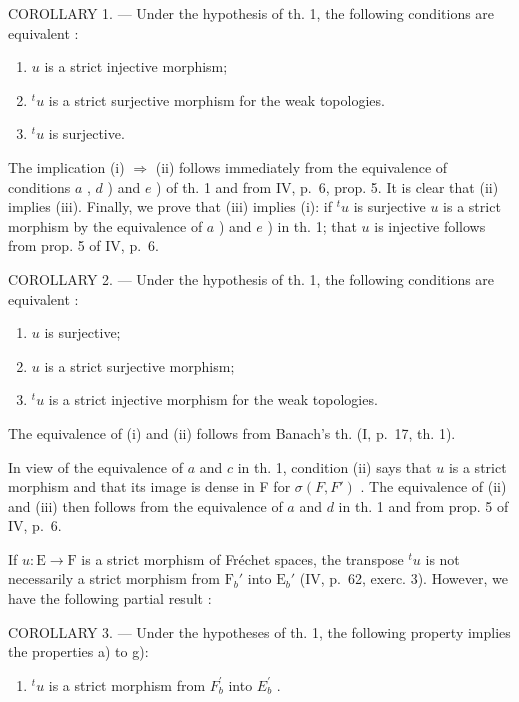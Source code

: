 COROLLARY 1. --- Under the hypothesis of th. 1, the following conditions are equivalent :

\begin{enumerate}
\def\labelenumi{(\roman{enumi})}
\item
  \(u\) is a strict injective morphism;
\item
  \({}^{t}u\) is a strict surjective morphism for the weak topologies.
\item
\({}^{t}u\) is surjective.
\end{enumerate}

The implication (i) \(\Rightarrow\) (ii) follows immediately from the equivalence of conditions \(a\) , \(d\) ) and \(e\) ) of th. 1 and from IV, p.~6, prop. 5. It is clear that (ii) implies (iii). Finally, we prove that (iii) implies (i): if \({}^t u\) is surjective \(u\) is a strict morphism by the equivalence of \(a\) ) and \(e\) ) in th. 1; that \(u\) is injective follows from prop. 5 of IV, p.~6.

COROLLARY 2. --- Under the hypothesis of th. 1, the following conditions are equivalent :

\begin{enumerate}
\def\labelenumi{(\roman{enumi})}
\item
  \(u\) is surjective;
\item
  \(u\) is a strict surjective morphism;
\item
  \({}^t u\) is a strict injective morphism for the weak topologies.
\end{enumerate}

The equivalence of (i) and (ii) follows from Banach's th. (I, p.~17, th. 1).

In view of the equivalence of \(a\) and \(c\) in th. 1, condition (ii) says that \(u\) is a strict morphism and that its image is dense in F for \(\sigma(F, F')\) . The equivalence of (ii) and (iii) then follows from the equivalence of \(a\) and \(d\) in th. 1 and from prop. 5 of IV, p.~6.

If \(u: \mathrm{E} \to \mathrm{F}\) is a strict morphism of Fréchet spaces, the transpose \({}^t u\) is not necessarily a strict morphism from \(\mathrm{F}_b'\) into \(\mathrm{E}_b'\) (IV, p.~62, exerc. 3). However, we have the following partial result :

COROLLARY 3. --- Under the hypotheses of th. 1, the following property implies the properties a) to g):

\begin{enumerate}
\def\labelenumi{\alph{enumi})}
\setcounter{enumi}{7}
\tightlist
\item
  \({}^{t}u\) is a strict morphism from \(F_{b}^{\prime}\) into \(E_{b}^{\prime}\) .
\end{enumerate}

